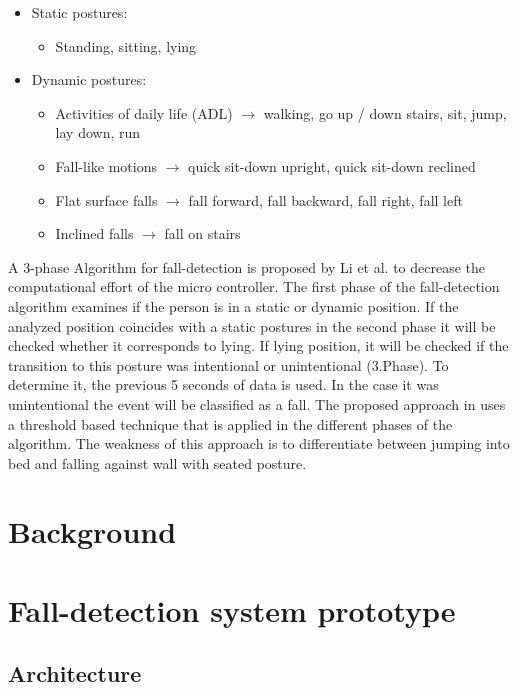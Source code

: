 \documentclass[review]{elsarticle}
\begin{document}
\begin{itemize}
	\item Static postures:
	\begin{itemize}
		\item Standing, sitting, lying
	\end{itemize}
	\item Dynamic postures:
	\begin{itemize}
		\item Activities of daily life (ADL) $\rightarrow$ walking, go up / down stairs, sit, jump, lay down, run
		\item Fall-like motions $\rightarrow$ quick sit-down upright, quick sit-down reclined
		\item Flat surface falls $\rightarrow$ fall forward, fall backward, fall right, fall left
		\item Inclined falls $\rightarrow$ fall on stairs
	\end{itemize}
\end{itemize}
A 3-phase Algorithm for fall-detection is proposed by Li et al. to decrease the computational effort of the micro controller. The first phase of the fall-detection algorithm examines if the person is in a static or dynamic position. If the analyzed position coincides with a static postures in the second phase it will be checked whether it corresponds to lying. If lying position, it will be checked if the transition to this posture was intentional or unintentional (3.Phase). To determine it, the previous 5 seconds of data is used. In the case it was unintentional the event will be classified as a fall. The proposed approach in \cite{Li2009} uses a threshold based technique that is applied in the different phases of the algorithm. The weakness of this approach is to differentiate between jumping into bed and falling against wall with seated posture.
\section{Background}
\label{sec:background}

\section{Fall-detection system prototype}
\label{sec:fall-detectionPrototype}	

\subsection{Architecture}
\end{document}
